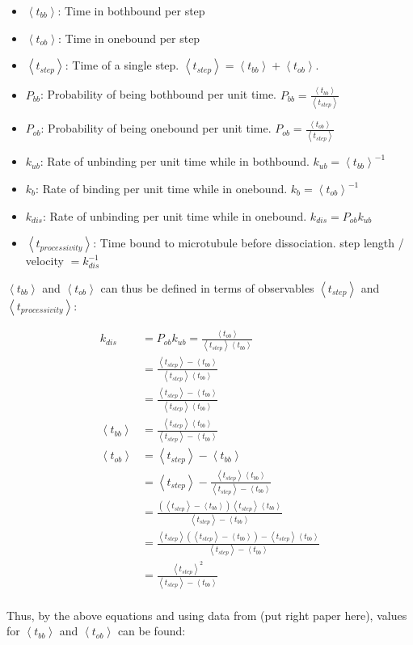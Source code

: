 \documentclass[10pt]{article} %
\begin{document}
\newcommand\tbb{\left<t_{bb}\right>}
\newcommand\tob{\left<t_{ob}\right>}
\newcommand\tstep{\left<t_{step}\right>}
\newcommand\tproc{\left<t_{processivity}\right>}
\newcommand\kub{k_{ub}}
\newcommand\kb{k_{b}}
\newcommand\ko{k_{dis}}

\begin{itemize}
\item $\tbb$: Time in bothbound per step
\item $\tob$: Time in onebound per step
\item $\tstep$: Time of a single step. $\tstep=\tbb+\tob$.
\item $P_{bb}$: Probability of being bothbound per unit time. $P_{bb} = \frac{\tbb}{\tstep}$
\item $P_{ob}$: Probability of being onebound per unit time. $P_{ob} = \frac{\tob}{\tstep}$
\item $\kub$: Rate of unbinding per unit time while in bothbound. $\kub = \tbb^{-1}$
\item $\kb$: Rate of binding per unit time while in onebound. $\kb = \tob^{-1}$
\item $\ko$: Rate of unbinding per unit time while in onebound. $\ko = P_{ob}\kub$
\item $\tproc$: Time bound to microtubule before dissociation. step length / velocity $= \ko^{-1}$
\end{itemize}

$\tbb$ and $\tob$ can thus be defined in terms of observables $\tstep$ and $\tproc$:

\begin{align*}
  \ko &= P_{ob}\kub = \frac{\tob}{\tstep\tbb}\\
  &= \frac{\tstep-\tbb}{\tstep\tbb}\\
  &= \frac{\tstep-\tbb}{\tstep\tbb}\\
  \tbb &= \frac{\tstep\tbb}{\tstep-\tbb}\\
  \tob &= \tstep-\tbb\\
  &= \tstep - \frac{\tstep\tbb}{\tstep-\tbb}\\
  &= \frac{\left(\tstep-\tbb\right)\tstep\tbb}{\tstep-\tbb}\\
  &= \frac{\tstep\left(\tstep-\tbb\right) - \tstep\tbb}{\tstep-\tbb}\\
  &= \frac{\tstep^2}{\tstep-\tbb}\\
\end{align*}

Thus, by the above equations and using data from (put right paper here), values for $\tbb$ and $\tob$ can be found:
\end{document}
